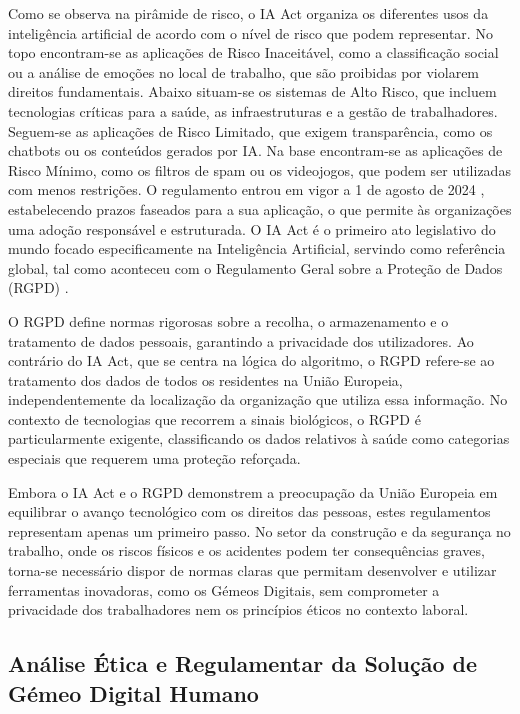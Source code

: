 Como se observa na pirâmide de risco, o IA Act organiza os diferentes usos da inteligência artificial de acordo com o nível de risco que podem representar. No topo encontram-se as aplicações de Risco Inaceitável, como a classificação social ou a análise de emoções no local de trabalho, que são proibidas por violarem direitos fundamentais. Abaixo situam-se os sistemas de Alto Risco, que incluem tecnologias críticas para a saúde, as infraestruturas e a gestão de trabalhadores. Seguem-se as aplicações de Risco Limitado, que exigem transparência, como os chatbots ou os conteúdos gerados por IA. Na base encontram-se as aplicações de Risco Mínimo, como os filtros de spam ou os videojogos, que podem ser utilizadas com menos restrições. O regulamento entrou em vigor a 1 de agosto de 2024 \cite{comision_ue_2024}, estabelecendo prazos faseados para a sua aplicação, o que permite às organizações uma adoção responsável e estruturada. O IA Act é o primeiro ato legislativo do mundo focado especificamente na Inteligência Artificial, servindo como referência global, tal como aconteceu com o Regulamento Geral sobre a Proteção de Dados (RGPD) \cite{rgpd_2016}.

O RGPD define normas rigorosas sobre a recolha, o armazenamento e o tratamento de dados pessoais, garantindo a privacidade dos utilizadores. Ao contrário do IA Act, que se centra na lógica do algoritmo, o RGPD refere-se ao tratamento dos dados de todos os residentes na União Europeia, independentemente da localização da organização que utiliza essa informação. No contexto de tecnologias que recorrem a sinais biológicos, o RGPD é particularmente exigente, classificando os dados relativos à saúde como categorias especiais que requerem uma proteção reforçada.

Embora o IA Act e o RGPD demonstrem a preocupação da União Europeia em equilibrar o avanço tecnológico com os direitos das pessoas, estes regulamentos representam apenas um primeiro passo. No setor da construção e da segurança no trabalho, onde os riscos físicos e os acidentes podem ter consequências graves, torna-se necessário dispor de normas claras que permitam desenvolver e utilizar ferramentas inovadoras, como os Gémeos Digitais, sem comprometer a privacidade dos trabalhadores nem os princípios éticos no contexto laboral.

\subsection{Análise Ética e Regulamentar da Solução de Gémeo Digital Humano}
\label{subsec:etica_analise}


